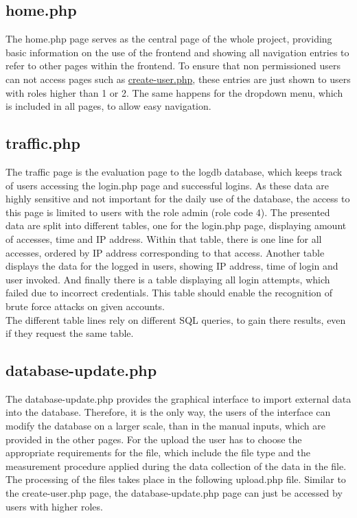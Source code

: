 
\subsection{home.php}

The home.php page serves as the central page of the whole project, providing basic information on the use of the frontend and showing all navigation entries to refer to other pages 
within the frontend. To ensure that non permissioned users can not access pages such as \hyperref[create-user.php]{create-user.php}, these entries are just shown to users with roles 
higher than 1 or 2. The same happens for the dropdown menu, which is included in all pages, to allow easy navigation. 

\subsection{traffic.php}
The traffic page is the evaluation page to the logdb database, which keeps track of users accessing the login.php page and successful logins. As these data are highly sensitive and 
not important for the daily use of the database, the access to this page is limited to users with the role admin (role code 4). The presented data are split into different tables, 
one for the login.php page, displaying amount of accesses, time and IP address. Within that table, there is one line for all accesses, ordered by IP address corresponding to that access. 
Another table displays the data for the logged in users, showing IP address, time of login and user invoked. And finally there is a table displaying all login attempts, which failed due to 
incorrect credentials. This table should enable the recognition of brute force attacks on given accounts.\\
The different table lines rely on different SQL queries, to gain there results, even if they request the same table.

\subsection{database-update.php}
The database-update.php provides the graphical interface to import external data into the database. Therefore, it is the only way, the users of the interface can modify the database 
on a larger scale, than in the manual inputs, which are provided in the other pages. For the upload the user has to choose the appropriate requirements for the file, which include the file type and the 
measurement procedure applied during the data collection of the data in the file. The processing of the files takes place in the following upload.php file. Similar to the 
create-user.php page, the database-update.php page can just be accessed by users with higher roles. 

